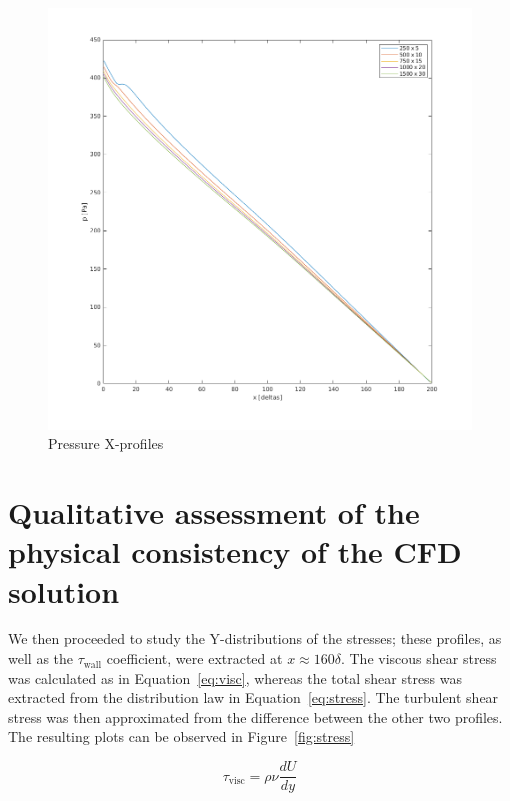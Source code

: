 \documentclass[12pt]{article}
\begin{document}
        \begin{figure}[ht!]
                \centering
                \includegraphics[width=\textwidth]{P_Independence.png}
                \caption{Pressure X-profiles}
                \label{fig:P_Ind}
        \end{figure}

\section{Qualitative assessment of the physical consistency of the CFD solution} \label{sec:qualitative}

        We then proceeded to study the Y-distributions of the stresses; these profiles, as well as the \( \tau_{\text{wall}} \) coefficient, were extracted at \(x \approx 160 \delta\). The viscous shear stress was calculated as in Equation~\ref{eq:visc}, whereas the total shear stress was extracted from the distribution law in Equation~\ref{eq:stress}. The turbulent shear stress was then approximated from the difference between the other two profiles. The resulting plots can be observed in Figure~\ref{fig:stress}

        \begin{equation} \label{eq:visc}
                \tau_{\text{visc}} = \rho \nu \frac{dU}{dy}
        \end{equation}
\end{document}

